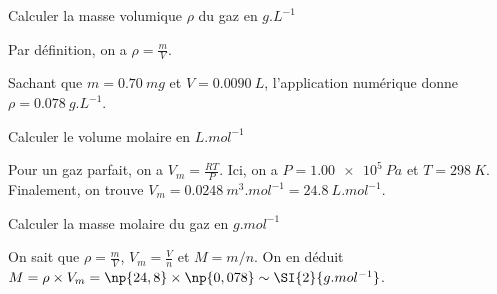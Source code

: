 
\begin{enonce}
Calculer la masse volumique $\rho$ du gaz en $\si{g.L^{-1}}$
\end{enonce}


\begin{corrige}
Par définition, on a $\rho=\frac{m}{V}$. 

Sachant que $m=\SI{0,70}{mg}$ et $V=\SI{0,0090}{L}$, l'application numérique donne $\rho=\SI{0,078}{g.L^{-1}}$.
\end{corrige}



\begin{enonce}
Calculer le volume molaire en $\si{L.mol^{-1}}$
\end{enonce}


\begin{corrige}
Pour un gaz parfait, on a $V_m=\frac{RT}{P}$. Ici, on a $P=\SI{1,00e5}{Pa}$ et $T=\SI{298}{K}$. Finalement, on trouve $V_m=\SI{0,0248}{m^3.mol^{-1}} =\SI{24,8}{L.mol^{-1}}$.
\end{corrige}



\begin{enonce}
Calculer la masse molaire du gaz en $\si{g.mol^{-1}}$
\end{enonce}


\begin{corrige}
On sait que $\rho=\frac{m}{V}$, $V_m = \frac{V}{n}$ et $M=m/n$. On en déduit $M=\rho \times V_m= 
\np{24,8}\times \np{0,078}\sim \SI{2}{g.mol^{-1}}$.
\end{corrige}



